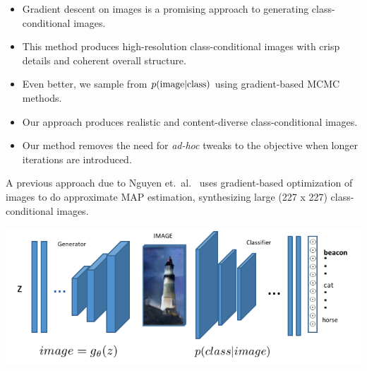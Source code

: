 \documentclass[landscape,a0b,final,a4resizeable]{include/a0poster}
\begin{document}
\begin{poster}
\begin{multicols}{3}
% 
%
% 
\vspace{0.2in}
% 
\begin{itemize}
	\item Gradient descent on images is a promising approach to generating class-conditional images.
	\item This method produces high-resolution class-conditional images with crisp details and coherent overall structure.
	\item Even better, we sample from $p(\textnormal{image} | \textnormal{class})$ using gradient-based MCMC methods.
	\item Our approach produces realistic and content-diverse class-conditional images.
	\item Our method removes the need for \emph{ad-hoc} tweaks to the objective when longer iterations are introduced.
\end{itemize}

\vspace{0.5in}

% 
A previous approach due to Nguyen et.\ al.\ \cite{Nguyen2016} uses gradient-based optimization of images to do approximate 
 MAP estimation, synthesizing large (227 x 227) class-conditional images.\\

\begin{center} 
  \centering
  \includegraphics{figures/img}
  \label{fig:net}
\end{center}


\end{multicols}
\end{poster}
\end{document}
